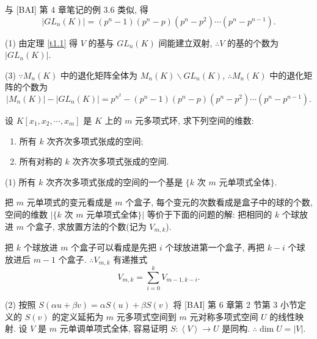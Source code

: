 \documentclass[color=black,device=normal,lang=cn,mode=geye]{elegantnote}
\begin{document}
\begin{solution}
    与 [BAI] 第 4 章笔记的例 3.6 类似, 得
    \[| GL_n(K)|=(p^n-1)(p^n-p)(p^n-p^2)\cdots(p^n-p^{n-1}).\]

    (1) 由定理 \ref{t1.1} 得 $V$ 的基与 $ GL_n(K)$ 间能建立双射, $\therefore V$ 的基的个数为 $| GL_n(K)|$.

    (3) $\because M_n(K)$ 中的退化矩阵全体为 $M_n(K)\backslash GL_n(K)$, $\therefore M_n(K)$ 中的退化矩阵的个数为
    \[|M_n(K)|-| GL_n(K)|=p^{n^2}-(p^n-1)(p^n-p)(p^n-p^2)\cdots(p^n-p^{n-1}).\]
\end{solution}
\begin{exercisec}[1.3.5]
    设 $K[x_1,x_2,\cdots,x_m]$ 是 $K$ 上的 $m$ 元多项式环, 求下列空间的维数:
    \begin{enumerate}
        \def\labelenumi{(\arabic{enumi})}
        \item 所有 $k$ 次齐次多项式张成的空间;
        \item 所有对称的 $k$ 次齐次多项式张成的空间.
    \end{enumerate}
\end{exercisec}
\begin{solution}
    (1) 所有 $k$ 次齐次多项式张成的空间的一个基是 $\{k$ 次 $m$ 元单项式全体$\}$.
    
    把 $m$ 元单项式的变元看成是 $m$ 个盒子, 每个变元的次数看成是盒子中的球的个数, 空间的维数 $|\{k$ 次 $m$ 元单项式全体$\}|$ 等价于下面的问题的解: 把相同的 $k$ 个球放进 $m$ 个盒子, 求放置方法的个数(记为 $V_{m,k}$).

    把 $k$ 个球放进 $m$ 个盒子可以看成是先把 $i$ 个球放进第一个盒子, 再把 $k-i$ 个球放进后 $m-1$ 个盒子. $\therefore V_{m,k}$ 有递推式
    \[V_{m,k}=\sum\limits_{i=0}^kV_{m-1,k-i}.\]

    (2) 按照 $S(\alpha u+\beta v)=\alpha S(u)+\beta S(v)$ 将 [BAI] 第 6 章第 2 节第 3 小节定义的 $S(v)$ 的定义延拓为 $m$ 元多项式空间到 $m$ 元对称多项式空间 $U$ 的线性映射. 设 $V$ 是 $m$ 元单调单项式全体, 容易证明 $S:\left<V\right>\to U$ 是同构. $\therefore\dim U=|V|$.
\end{solution}
\end{document}

